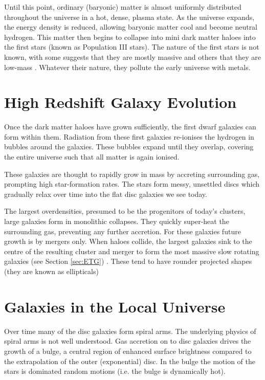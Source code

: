 	Until this point, ordinary (baryonic) matter is almost uniformly distributed throughout the universe in a hot, dense, plasma state. As the universe expands, the energy density is reduced, allowing baryonic matter cool and become neutral hydrogen. This matter then begins to collapse into mini dark matter haloes into the first stars (known as Population III stars). The nature of the first stars is not known, with some suggests that they are mostly massive \citep[e.g.][and the references therein]{Bromm2011} and others that they are low-mass \citep[e.g.][]{Stacy2014}. Whatever their nature, they pollute the early universe with metals. 

\section{High Redshift Galaxy Evolution}
	Once the dark matter haloes have grown sufficiently, the first dwarf galaxies can form within them. Radiation from these first galaxies re-ionises the hydrogen in bubbles around the galaxies. These bubbles expand until they overlap, covering the entire universe such that all matter is again ionised. 

	These galaxies are thought to rapidly grow in mass by accreting surrounding gas, prompting high star-formation rates. The stars form messy, unsettled discs which gradually relax over time into the flat disc galaxies we see today.

	The largest overdensities, presumed to be the progenitors of today's clusters, large galaxies form in monolithic collapses. They quickly super-heat the surrounding gas, preventing any further accretion. For these galaxies future growth is by mergers only. When haloes collide, the largest galaxies sink to the centre of the resulting cluster and merger to form the most massive slow rotating galaxies (see Section \ref{sec:ETG}) \citep[e.g.][fig.30]{Cappellari2016}. These tend to have rounder projected shapes (they are known as ellipticals)

\section{Galaxies in the Local Universe}
	Over time many of the disc galaxies form spiral arms. The underlying physics of spiral arms is not well understood. Gas accretion on to disc galaxies drives the growth of a bulge, a central region of enhanced surface brightness compared to the extrapolation of the outer (exponential) disc. In the bulge the motion of the stars is dominated random motions (i.e. the bulge is dynamically hot). 


